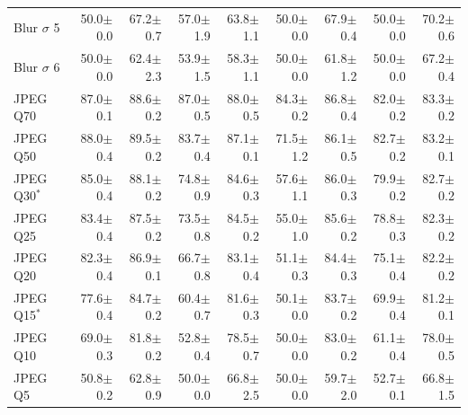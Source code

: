 \begin{table}[H]
\begin{tabular}{lrrrrrrrr}
Blur $\sigma$ 5 & 50.0{\scriptsize$\pm$0.0} & 67.2{\scriptsize$\pm$0.7} & 57.0{\scriptsize$\pm$1.9} & 63.8{\scriptsize$\pm$1.1} & 50.0{\scriptsize$\pm$0.0} & 67.9{\scriptsize$\pm$0.4} & 50.0{\scriptsize$\pm$0.0} & 70.2{\scriptsize$\pm$0.6} \\
Blur $\sigma$ 6 & 50.0{\scriptsize$\pm$0.0} & 62.4{\scriptsize$\pm$2.3} & 53.9{\scriptsize$\pm$1.5} & 58.3{\scriptsize$\pm$1.1} & 50.0{\scriptsize$\pm$0.0} & 61.8{\scriptsize$\pm$1.2} & 50.0{\scriptsize$\pm$0.0} & 67.2{\scriptsize$\pm$0.4} \\
\addlinespace
JPEG Q70 & 87.0{\scriptsize$\pm$0.1} & 88.6{\scriptsize$\pm$0.2} & 87.0{\scriptsize$\pm$0.5} & 88.0{\scriptsize$\pm$0.5} & 84.3{\scriptsize$\pm$0.2} & 86.8{\scriptsize$\pm$0.4} & 82.0{\scriptsize$\pm$0.2} & 83.3{\scriptsize$\pm$0.2} \\
JPEG Q50 & 88.0{\scriptsize$\pm$0.4} & 89.5{\scriptsize$\pm$0.2} & 83.7{\scriptsize$\pm$0.4} & 87.1{\scriptsize$\pm$0.1} & 71.5{\scriptsize$\pm$1.2} & 86.1{\scriptsize$\pm$0.5} & 82.7{\scriptsize$\pm$0.2} & 83.2{\scriptsize$\pm$0.1} \\
JPEG Q30$^{*}$ & 85.0{\scriptsize$\pm$0.4} & 88.1{\scriptsize$\pm$0.2} & 74.8{\scriptsize$\pm$0.9} & 84.6{\scriptsize$\pm$0.3} & 57.6{\scriptsize$\pm$1.1} & 86.0{\scriptsize$\pm$0.3} & 79.9{\scriptsize$\pm$0.2} & 82.7{\scriptsize$\pm$0.2} \\
JPEG Q25 & 83.4{\scriptsize$\pm$0.4} & 87.5{\scriptsize$\pm$0.2} & 73.5{\scriptsize$\pm$0.8} & 84.5{\scriptsize$\pm$0.2} & 55.0{\scriptsize$\pm$1.0} & 85.6{\scriptsize$\pm$0.2} & 78.8{\scriptsize$\pm$0.3} & 82.3{\scriptsize$\pm$0.2} \\
JPEG Q20 & 82.3{\scriptsize$\pm$0.4} & 86.9{\scriptsize$\pm$0.1} & 66.7{\scriptsize$\pm$0.8} & 83.1{\scriptsize$\pm$0.4} & 51.1{\scriptsize$\pm$0.3} & 84.4{\scriptsize$\pm$0.3} & 75.1{\scriptsize$\pm$0.4} & 82.2{\scriptsize$\pm$0.2} \\
JPEG Q15$^{*}$ & 77.6{\scriptsize$\pm$0.4} & 84.7{\scriptsize$\pm$0.2} & 60.4{\scriptsize$\pm$0.7} & 81.6{\scriptsize$\pm$0.3} & 50.1{\scriptsize$\pm$0.0} & 83.7{\scriptsize$\pm$0.2} & 69.9{\scriptsize$\pm$0.4} & 81.2{\scriptsize$\pm$0.1} \\
JPEG Q10 & 69.0{\scriptsize$\pm$0.3} & 81.8{\scriptsize$\pm$0.2} & 52.8{\scriptsize$\pm$0.4} & 78.5{\scriptsize$\pm$0.7} & 50.0{\scriptsize$\pm$0.0} & 83.0{\scriptsize$\pm$0.2} & 61.1{\scriptsize$\pm$0.4} & 78.0{\scriptsize$\pm$0.5} \\
JPEG Q5 & 50.8{\scriptsize$\pm$0.2} & 62.8{\scriptsize$\pm$0.9} & 50.0{\scriptsize$\pm$0.0} & 66.8{\scriptsize$\pm$2.5} & 50.0{\scriptsize$\pm$0.0} & 59.7{\scriptsize$\pm$2.0} & 52.7{\scriptsize$\pm$0.1} & 66.8{\scriptsize$\pm$1.5} \\

\end{tabular}
\end{table}
